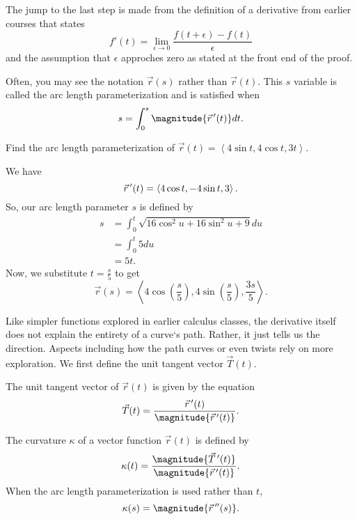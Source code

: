\begin{remark}
    The jump to the last step is made from the definition of a derivative from earlier courses that states
    \[f'(t) = \lim_{\epsilon \to 0} \frac{f(t + \epsilon) - f(t)}{\epsilon}\]
    and the assumption that $\epsilon$ approches zero as stated at the front end of the proof.
\end{remark}

\begin{remark}
    Often, you may see the notation $\vec{r}(s)$ rather than $\vec{r}(t)$. This $s$ variable is called the arc length parameterization and is satisfied when
    \[s = \int_{0}^{s} \magnitude{\ddvec{r}(t)}dt.\]
\end{remark}

\begin{example}
    Find the arc length parameterization of $\vec{r}(t) = \left<4\sin t, 4\cos t, 3t\right>$.

    \begin{soln}
        We have
        \[\vec{r}\,^{\prime}(t) = \left<4\cos t, -4\sin t, 3\right>.\]
        So, our arc length parameter $s$ is defined by
        \begin{align*}
            s &= \int_{0}^{t} \sqrt{16 \cos^{2}u + 16 \sin^{2}u + 9}du \\
            &= \int_{0}^{t} 5du \\
            &= 5t.
        \end{align*}
        Now, we substitute $t = \frac{s}{5}$ to get
        \[\vec{r}(s) = \left<4\cos\left(\frac{s}{5}\right), 4\sin\left(\frac{s}{5}\right), \frac{3s}{5}\right>.\]
    \end{soln}
\end{example}

Like simpler functions explored in earlier calculus classes, the derivative itself does not explain the entirety of a curve`s path. Rather, it just tells us the direction. Aspects including how the path curves or even twists rely on more exploration. We first define the unit tangent vector $\vec{T}(t)$.

\begin{proposition}
    The unit tangent vector of $\vec{r}(t)$ is given by the equation
    \[\vec{T}(t) = \frac{\ddvec{r}(t)}{\magnitude{\ddvec{r}(t)}}.\]
\end{proposition}

\begin{proposition}
    The curvature $\kappa$ of a vector function $\vec{r}(t)$ is defined by
    \[\kappa(t) = \frac{\magnitude{\ddvec{T}(t)}}{\magnitude{\ddvec{r}(t)}}.\]
    When the arc length parameterization is used rather than $t$,
    \[\kappa(s) = \magnitude{\vec{r}\,^{\prime\prime}(s)}.\]
\end{proposition}

